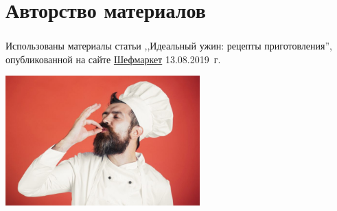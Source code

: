 \documentclass[t]{beamer}  %
\begin{document}
\section{Авторство материалов}	
\begin{frame} %
	\frametitle{\insertsection}	
	Использованы материалы статьи ,,Идеальный ужин: рецепты приготовления'', опубликованной на сайте 
	 \color [RGB]{0,0,255} \href{https://www.chefmarket.ru/blog/idealnyj-uzhin-recepty-prigotovlenija/}{Шефмаркет} \color [RGB]{0,0,0} 13.08.2019~г.
	\begin{center}
		\includegraphics[height=5cm, keepaspectratio]{5}
	\end{center}
	\begin{block}{}
		\hyperlink{begin}{} 
	\end{block}
\end{frame}
	
	
\end{document}
